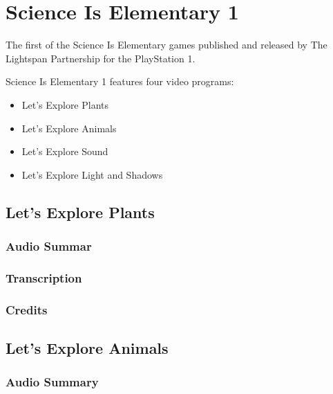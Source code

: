 \chapter{Science Is Elementary 1}


The first of the Science Is Elementary games published and released by The Lightspan Partnership for the PlayStation 1.

Science Is Elementary 1 features four video programs:

\begin{itemize}
    \item Let's Explore Plants
    \item Let's Explore Animals
    \item Let's Explore Sound
    \item Let's Explore Light and Shadows
\end{itemize}

\clearpage
\newpage

\section{Let's Explore Plants}

\subsection{Audio Summar}

\subsection{Transcription}

\subsection{Credits}

\section{Let's Explore Animals}

\subsection{Audio Summary}

